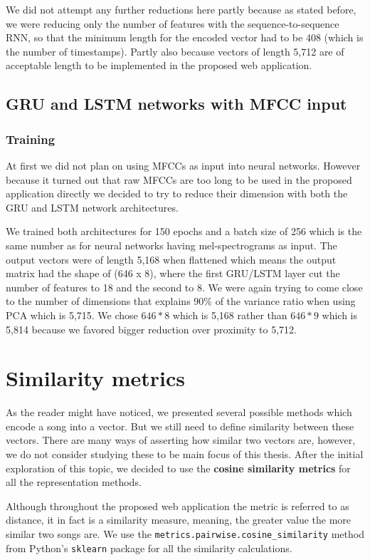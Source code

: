 We did not attempt any further reductions here partly because as stated before, we were reducing only the number of features with the sequence-to-sequence RNN, so that the minimum length for the encoded vector had to be 408 (which is the number of timestamps). Partly also because vectors of length 5,712 are of acceptable length to be implemented in the proposed web application. 


\subsection{GRU and LSTM networks with MFCC input}\label{ssec:GRU_LSTM_MFCC_experiments}

\subsubsection{Training}
At first we did not plan on using MFCCs as input into neural networks. However because it turned out that raw MFCCs are too long to be used in the proposed application directly we decided to try to reduce their dimension with both the GRU and LSTM network architectures. 

We trained both architectures for 150 epochs and a batch size of 256 which is the same number as for neural networks having mel-spectrograms as input. The output vectors were of length 5,168 when flattened which means the output matrix had the shape of (646 x 8), where the first GRU/LSTM layer cut the number of features to 18 and the second to 8. We were again trying to come close to the number of dimensions that explains 90\% of the variance ratio when using PCA which is 5,715. We chose $646*8$ which is 5,168 rather than $646*9$ which is 5,814 because we favored bigger reduction over proximity to 5,712.

\section{Similarity metrics}\label{sec:similarity_metrics}
As the reader might have noticed, we presented several possible methods which encode a song into a vector. But we still need to define similarity between these vectors. There are many ways of asserting how similar two vectors are, however, we do not consider studying these to be main focus of this thesis. After the initial exploration of this topic, we decided to use the \textbf{cosine similarity metrics} for all the representation methods. 

Although throughout the proposed web application the metric is referred to as distance, it in fact is a similarity measure, meaning, the greater value the more similar two songs are. We use the \texttt{metrics.pairwise.cosine\_similarity} method from Python's \texttt{sklearn} package for all the similarity calculations.

